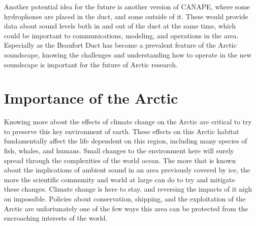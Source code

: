 Another potential idea for the future is another version of CANAPE, where some hydrophones are placed in the duct, and some outside of it. These would provide data about sound levels both in and out of the duct at the same time, which could be important to communications, modeling, and operations in the area. Especially as the Beaufort Duct has become a prevalent feature of the Arctic soundscape, knowing the challenges and understanding how to operate in the new soundscape is important for the future of Arctic research.


\section{Importance of the Arctic}

Knowing more about the effects of climate change on the Arctic are critical to try to preserve this key environment of earth. These effects on this Arctic habitat fundamentally affect the life dependent on this region, including many species of fish, whales, and humans. Small changes to the environment here will surely spread through the complexities of the world ocean. The more that is known about the implications of ambient sound in an area previously covered by ice, the more the scientific community and world at large can do to try and mitigate these changes. Climate change is here to stay, and reversing the impacts of it nigh on impossible. Policies about conservation, shipping, and the exploitation of the Arctic are unfortunately one of the few ways this area can be protected from the encroaching interests of the world.